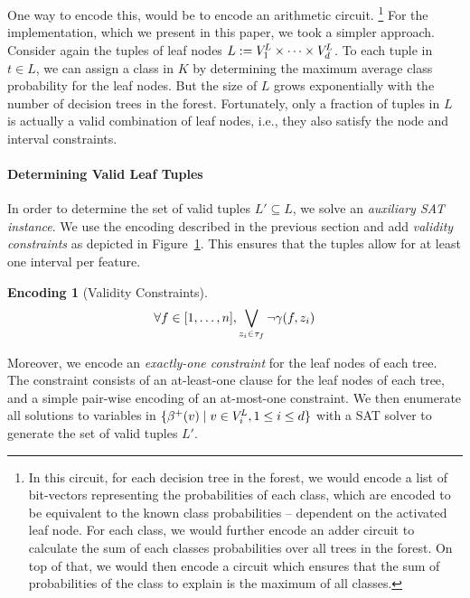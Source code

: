 \documentclass{easychair}
\theoremstyle{definition}
\newtheorem{encoding}{Encoding}[section]
\begin{document}
One way to encode this, would be to encode an arithmetic circuit.%
\footnote{In this circuit, for each decision tree in the forest, we would encode a list of bit-vectors representing the probabilities of each class, which are encoded to be equivalent to the known class probabilities -- dependent on the activated leaf node. 
For each class, we would further encode an adder circuit to calculate the sum of each classes probabilities over all trees in the forest. 
On top of that, we would then encode a circuit which ensures that the sum of probabilities of the class to explain is the maximum of all classes.}
For the implementation, which we present in this paper, we took a simpler approach. 
Consider again the tuples of leaf nodes $L := V^{\!L}_1 \times \dots \times V^{\!L}_d$. 
To each tuple in $t \in L$, we can assign a class in $K$ by determining the maximum average class probability for the leaf nodes. 
But the size of $L$ grows exponentially with the number of decision trees in the forest. 
Fortunately, only a fraction of tuples in $L$ is actually a valid combination of leaf nodes, i.e., they also satisfy the node and interval constraints. 

\paragraph{Determining Valid Leaf Tuples}
\label{sec:valid-tuples}

\newcommand{\validtuples}{\ensuremath{L'}}%
\newcommand{\tuplev}[1]{\ensuremath{\delta(#1)}}%
In order to determine the set of valid tuples $\validtuples \subseteq L$, we solve an \emph{auxiliary SAT instance}. 
We use the encoding described in the previous section and add \emph{validity constraints} as depicted in Figure~\ref{enc:validity}. 
This ensures that the tuples allow for at least one interval per feature. 
%
\begin{encoding}[Validity Constraints]
\label{enc:validity}
\begin{align*}
\forall f \in [1, \dots, n], \bigvee\limits_{z_i \in \tau_f} \lnot \gamma(f,z_i)
\end{align*}
\end{encoding}
%
Moreover, we encode an \emph{exactly-one constraint} for the leaf nodes of each tree. 
The constraint consists of an at-least-one clause for the leaf nodes of each tree, and a simple pair-wise encoding of an at-most-one constraint. 
We then enumerate all solutions to variables in $\{ \beta^+(v) \mid v \in V^{\!L}_i, 1 \leq i \leq d \}$ with a SAT solver to generate the set of valid tuples \validtuples. 
\end{document}
